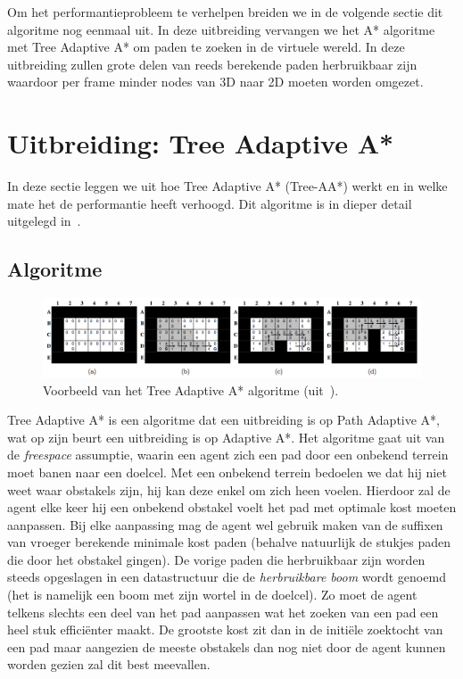 Om het performantieprobleem te verhelpen breiden we in de volgende sectie dit algoritme nog eenmaal uit. In deze uitbreiding vervangen we het A* algoritme met Tree Adaptive A* om paden te zoeken in de virtuele wereld. In deze uitbreiding zullen grote delen van reeds berekende paden herbruikbaar zijn waardoor per frame minder nodes van 3D naar 2D moeten worden omgezet.
 
\section{Uitbreiding: Tree Adaptive A*} \label{sec:naive_uitbr}
In deze sectie leggen we uit hoe Tree Adaptive A* (Tree-AA*) werkt en in welke mate het de performantie heeft verhoogd. Dit algoritme is in dieper detail uitgelegd in~\cite{hernandez2011tree}.

\subsection{Algoritme}

\begin{figure}
  \centering
  \includegraphics[width=\linewidth]{img/TAAStar}
  \caption{Voorbeeld van het Tree Adaptive A* algoritme (uit~\cite{hernandez2011tree}).}
  \label{fig:taastar}
\end{figure}

Tree Adaptive A* is een algoritme dat een uitbreiding is op Path Adaptive A*, wat op zijn beurt een uitbreiding is op Adaptive A*. Het algoritme gaat uit van de \textit{freespace} assumptie, waarin een agent zich een pad door een onbekend terrein moet banen naar een doelcel. Met een onbekend terrein bedoelen we dat hij niet weet waar obstakels zijn, hij kan deze enkel om zich heen voelen. Hierdoor zal de agent elke keer hij een onbekend obstakel voelt het pad met optimale kost moeten aanpassen. Bij elke aanpassing mag de agent wel gebruik maken van de suffixen van vroeger berekende minimale kost paden (behalve natuurlijk de stukjes paden die door het obstakel gingen). De vorige paden die herbruikbaar zijn worden steeds opgeslagen in een datastructuur die de \textit{herbruikbare boom} wordt genoemd (het is namelijk een boom met zijn wortel in de doelcel). Zo moet de agent telkens slechts een deel van het pad aanpassen wat het zoeken van een pad een heel stuk effici\"enter maakt. De grootste kost zit dan in de initi\"ele zoektocht van een pad maar aangezien de meeste obstakels dan nog niet door de agent kunnen worden gezien zal dit best meevallen. 


